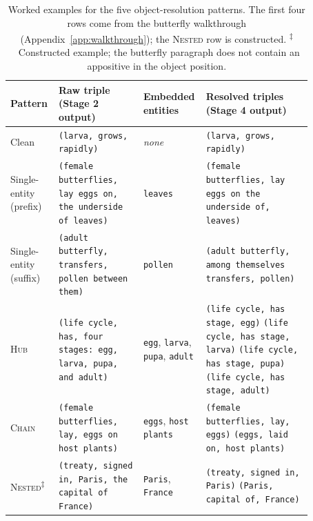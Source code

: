 \documentclass[11pt]{article}
\begin{document}
\begin{table}[t!]
\centering
\small
\setlength{\tabcolsep}{5pt}
\renewcommand{\arraystretch}{1.2}
\begin{tabular}{p{0.13\linewidth} | p{0.27\linewidth} | p{0.13\linewidth} | p{0.34\linewidth}}
\toprule
\textbf{Pattern} & \textbf{Raw triple (Stage 2 output)} & \textbf{Embedded entities} & \textbf{Resolved triples (Stage 4 output)} \\
\midrule
Clean & \texttt{(larva, grows, rapidly)} & \emph{none} & \texttt{(larva, grows, rapidly)} \\
\midrule
Single-entity \newline (prefix) & \texttt{(female butterflies, lay eggs on, the underside of leaves)} & \texttt{leaves} & \texttt{(female butterflies, lay eggs on the underside of, leaves)} \\
\midrule
Single-entity \newline (suffix) & \texttt{(adult butterfly, transfers, pollen between them)} & \texttt{pollen} & \texttt{(adult butterfly, among themselves transfers, pollen)} \\
\midrule
\textsc{Hub} & \texttt{(life cycle, has, four stages: egg, larva, pupa, and adult)} & \texttt{egg}, \texttt{larva}, \texttt{pupa}, \texttt{adult} & \texttt{(life cycle, has stage, egg)} \newline \texttt{(life cycle, has stage, larva)} \newline \texttt{(life cycle, has stage, pupa)} \newline \texttt{(life cycle, has stage, adult)} \\
\midrule
\textsc{Chain} & \texttt{(female butterflies, lay, eggs on host plants)} & \texttt{eggs}, \texttt{host plants} & \texttt{(female butterflies, lay, eggs)} \newline \texttt{(eggs, laid on, host plants)} \\
\midrule
\textsc{Nested}\textsuperscript{$\ddagger$} & \texttt{(treaty, signed in, Paris, the capital of France)} & \texttt{Paris}, \texttt{France} & \texttt{(treaty, signed in, Paris)} \newline \texttt{(Paris, capital of, France)} \\
\bottomrule
\end{tabular}
\caption{Worked examples for the five object-resolution patterns. The first four rows come from the butterfly walkthrough (Appendix~\ref{app:walkthrough}); the \textsc{Nested} row is constructed. \textsuperscript{$\ddagger$}~Constructed example; the butterfly paragraph does not contain an appositive in the object position.}
\label{tab:obj-res-examples}
\end{table}
\end{document}
